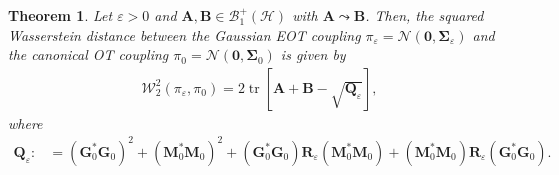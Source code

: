 \documentclass[10pt,a4paper]{amsart}
\newtheorem{theorem}{Theorem}
\renewcommand{\c}[1]{\mathcal{#1}}
\newcommand{\m}[1]{\mathbf{#1}}
\DeclareMathOperator{\tr}{tr}
\begin{document}
\begin{theorem}\label{thm:W2:exact}
Let $\varepsilon > 0$ and $\m{A}, \m{B} \in \c{B}_{1}^{+}(\c{H})$ with $\m{A} \leadsto \m{B}$. Then, the squared Wasserstein distance between the Gaussian EOT coupling $\pi_{\varepsilon} = \c{N}(\m{0}, \m{\Sigma}_{\varepsilon})$ and the canonical OT coupling $\pi_{0} = \c{N}(\m{0}, \m{\Sigma}_{0})$ is given by
\begin{align*}
    \c{W}_{2}^{2}(\pi_{\varepsilon}, \pi_{0}) = 2 \tr [\m{A} + \m{B}- \sqrt{\m{Q}_{\varepsilon}}],
\end{align*}
where
\begin{align*}
    \m{Q}_{\varepsilon} :&= (\m{G}_{0}^{*} \m{G}_{0})^{2} + (\m{M}_{0}^{*} \m{M}_{0})^{2} + (\m{G}_{0}^{*} \m{G}_{0}) \m{R}_{\varepsilon} (\m{M}_{0}^{*} \m{M}_{0}) + (\m{M}_{0}^{*} \m{M}_{0}) \m{R}_{\varepsilon} (\m{G}_{0}^{*} \m{G}_{0}). 
\end{align*}
\end{theorem}
\end{document}
